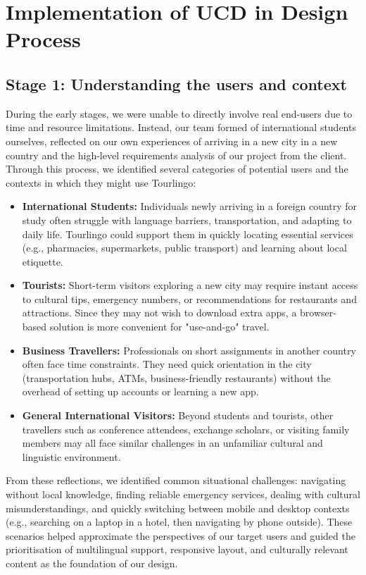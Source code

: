 \section{Implementation of UCD in Design Process}

\subsection{Stage 1: Understanding the users and context} During the early stages, we were unable to directly involve real end-users due to time and resource limitations. Instead, our team formed of international students ourselves, reflected on our own experiences of arriving in a new city in a new country and the high-level requirements analysis of our project from the client. Through this process, we identified several categories of potential users and the contexts in which they might use Tourlingo:
    \begin{itemize}
        \item \textbf{International Students:} Individuals newly arriving in a foreign country for study often struggle with language barriers, transportation, and adapting to daily life. Tourlingo could support them in quickly locating essential services (e.g., pharmacies, supermarkets, public transport) and learning about local etiquette. 
        \item \textbf{Tourists:} Short-term visitors exploring a new city may require instant access to cultural tips, emergency numbers, or recommendations for restaurants and attractions. Since they may not wish to download extra apps, a browser-based solution is more convenient for "use-and-go" travel. 
        \item \textbf{Business Travellers:} Professionals on short assignments in another country often face time constraints. They need quick orientation in the city (transportation hubs, ATMs, business-friendly restaurants) without the overhead of setting up accounts or learning a new app.
        \item \textbf{General International Visitors:} Beyond students and tourists, other travellers such as conference attendees, exchange scholars, or visiting family members may all face similar challenges in an unfamiliar cultural and linguistic environment.  
    \end{itemize}

From these reflections, we identified common situational challenges: navigating without local knowledge, finding reliable emergency services, dealing with cultural misunderstandings, and quickly switching between mobile and desktop contexts (e.g., searching on a laptop in a hotel, then navigating by phone outside). These scenarios helped approximate the perspectives of our target users and guided the prioritisation of multilingual support, responsive layout, and culturally relevant content as the foundation of our design.
    

